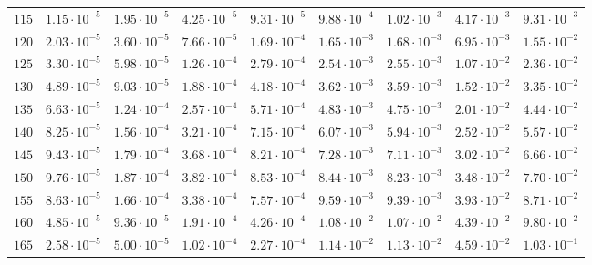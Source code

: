 \begin{landscape}
\begin{table}
\begin{tabular}{lcccccccc}
$	115	$ & $	1.15 \cdot 10^{-5}	$ & $	1.95 \cdot 10^{-5}	$ & $	4.25 \cdot 10^{-5}	$ & $	9.31 \cdot 10^{-5}	$ & $	9.88 \cdot 10^{-4}	$ & $	1.02 \cdot 10^{-3}	$ & $	4.17 \cdot 10^{-3}	$ & $	9.31 \cdot 10^{-3}	 $ \\
$	120	$ & $	2.03 \cdot 10^{-5}	$ & $	3.60 \cdot 10^{-5}	$ & $	7.66 \cdot 10^{-5}	$ & $	1.69 \cdot 10^{-4}	$ & $	1.65 \cdot 10^{-3}	$ & $	1.68 \cdot 10^{-3}	$ & $	6.95 \cdot 10^{-3}	$ & $	1.55 \cdot 10^{-2}	 $ \\
$	125	$ & $	3.30 \cdot 10^{-5}	$ & $	5.98 \cdot 10^{-5}	$ & $	1.26 \cdot 10^{-4}	$ & $	2.79 \cdot 10^{-4}	$ & $	2.54 \cdot 10^{-3}	$ & $	2.55 \cdot 10^{-3}	$ & $	1.07 \cdot 10^{-2}	$ & $	2.36 \cdot 10^{-2}	 $ \\
$	130	$ & $	4.89 \cdot 10^{-5}	$ & $	9.03 \cdot 10^{-5}	$ & $	1.88 \cdot 10^{-4}	$ & $	4.18 \cdot 10^{-4}	$ & $	3.62 \cdot 10^{-3}	$ & $	3.59 \cdot 10^{-3}	$ & $	1.52 \cdot 10^{-2}	$ & $	3.35 \cdot 10^{-2}	 $ \\
$	135	$ & $	6.63 \cdot 10^{-5}	$ & $	1.24 \cdot 10^{-4}	$ & $	2.57 \cdot 10^{-4}	$ & $	5.71 \cdot 10^{-4}	$ & $	4.83 \cdot 10^{-3}	$ & $	4.75 \cdot 10^{-3}	$ & $	2.01 \cdot 10^{-2}	$ & $	4.44 \cdot 10^{-2}	 $ \\
$	140	$ & $	8.25 \cdot 10^{-5}	$ & $	1.56 \cdot 10^{-4}	$ & $	3.21 \cdot 10^{-4}	$ & $	7.15 \cdot 10^{-4}	$ & $	6.07 \cdot 10^{-3}	$ & $	5.94 \cdot 10^{-3}	$ & $	2.52 \cdot 10^{-2}	$ & $	5.57 \cdot 10^{-2}	 $ \\
$	145	$ & $	9.43 \cdot 10^{-5}	$ & $	1.79 \cdot 10^{-4}	$ & $	3.68 \cdot 10^{-4}	$ & $	8.21 \cdot 10^{-4}	$ & $	7.28 \cdot 10^{-3}	$ & $	7.11 \cdot 10^{-3}	$ & $	3.02 \cdot 10^{-2}	$ & $	6.66 \cdot 10^{-2}	 $ \\
$	150	$ & $	9.76 \cdot 10^{-5}	$ & $	1.87 \cdot 10^{-4}	$ & $	3.82 \cdot 10^{-4}	$ & $	8.53 \cdot 10^{-4}	$ & $	8.44 \cdot 10^{-3}	$ & $	8.23 \cdot 10^{-3}	$ & $	3.48 \cdot 10^{-2}	$ & $	7.70 \cdot 10^{-2}	 $ \\
$	155	$ & $	8.63 \cdot 10^{-5}	$ & $	1.66 \cdot 10^{-4}	$ & $	3.38 \cdot 10^{-4}	$ & $	7.57 \cdot 10^{-4}	$ & $	9.59 \cdot 10^{-3}	$ & $	9.39 \cdot 10^{-3}	$ & $	3.93 \cdot 10^{-2}	$ & $	8.71 \cdot 10^{-2}	 $ \\
$	160	$ & $	4.85 \cdot 10^{-5}	$ & $	9.36 \cdot 10^{-5}	$ & $	1.91 \cdot 10^{-4}	$ & $	4.26 \cdot 10^{-4}	$ & $	1.08 \cdot 10^{-2}	$ & $	1.07 \cdot 10^{-2}	$ & $	4.39 \cdot 10^{-2}	$ & $	9.80 \cdot 10^{-2}	 $ \\
$	165	$ & $	2.58 \cdot 10^{-5}	$ & $	5.00 \cdot 10^{-5}	$ & $	1.02 \cdot 10^{-4}	$ & $	2.27 \cdot 10^{-4}	$ & $	1.14 \cdot 10^{-2}	$ & $	1.13 \cdot 10^{-2}	$ & $	4.59 \cdot 10^{-2}	$ & $	1.03 \cdot 10^{-1}	 $ \\

\end{tabular}
\end{table}
\end{landscape}
